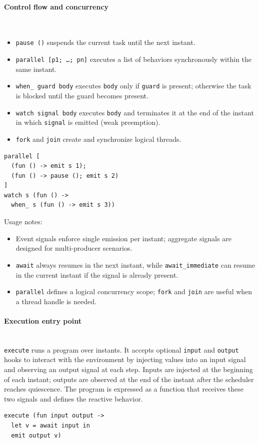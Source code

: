 \paragraph{Control flow and concurrency}\mbox{}\\
\begin{itemize}
\item \texttt{pause ()} suspends the current task until the next instant.
\item \texttt{parallel [p1; \dots; pn]} executes a list of behaviors
  synchronously within the same instant.
\item \texttt{when\_ guard body} executes \texttt{body} only if \texttt{guard} is
  present; otherwise the task is blocked until the guard becomes present.
\item \texttt{watch signal body} executes \texttt{body} and terminates it at the
  end of the instant in which \texttt{signal} is emitted (weak preemption).
\item \texttt{fork} and \texttt{join} create and synchronize logical threads.
\end{itemize}
\begin{lstlisting}[style=tempo]
parallel [
  (fun () -> emit s 1);
  (fun () -> pause (); emit s 2)
]
watch s (fun () ->
  when_ s (fun () -> emit s 3))
\end{lstlisting}

Usage notes:
\begin{itemize}
\item Event signals enforce single emission per instant; aggregate signals are
  designed for multi-producer scenarios.
\item \texttt{await} always resumes in the next instant, while
  \texttt{await\_immediate} can resume in the current instant if the signal is
  already present.
\item \texttt{parallel} defines a logical concurrency scope; \texttt{fork} and
  \texttt{join} are useful when a thread handle is needed.
\end{itemize}

\paragraph{Execution entry point}\mbox{}\\
\texttt{execute} runs a program over instants. It accepts optional
\texttt{input} and \texttt{output} hooks to interact with the environment by
injecting values into an input signal and observing an output signal at each
step. Inputs are injected at the beginning of each instant; outputs are
observed at the end of the instant after the scheduler reaches quiescence. The
program is expressed as a function that receives these two signals and defines
the reactive behavior.
\begin{lstlisting}[style=tempo]
execute (fun input output ->
  let v = await input in
  emit output v)
\end{lstlisting}


